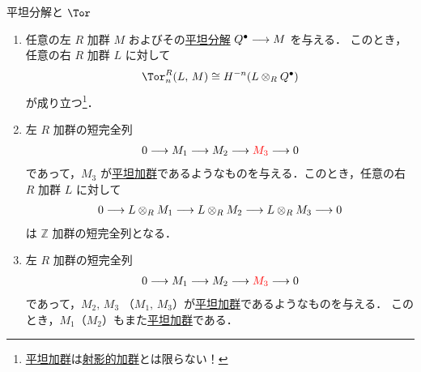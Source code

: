 \documentclass[algtopo_main]{subfiles}
\begin{document}
\begin{myprop}[label=prop:Tor-flat-2,breakable]{平坦分解と $\Tor$}
    \begin{enumerate}
        \item 任意の左 $R$ 加群 $M$ およびその\hyperref[def:flat-resolution]{平坦分解} $Q^\bullet \longrightarrow M$ を与える．
        このとき，任意の右 $R$ 加群 $L$ に対して
        \begin{align}
            \Tor^R_n(L,\, M) \cong H^{-n} (L \otimes_R Q^\bullet)
        \end{align}
        が成り立つ\footnote{\hyperref[def:flat-mod]{平坦加群}は\hyperref[def:proj-mod]{射影的加群}とは限らない！}．
        \item 左 $R$ 加群の短完全列
        \begin{align}
            0 \longrightarrow M_1 \longrightarrow M_2 \longrightarrow \textcolor{red}{M_3} \longrightarrow 0
        \end{align}
        であって，$M_3$ が\hyperref[def:flat-mod]{平坦加群}であるようなものを与える．このとき，任意の右 $R$ 加群 $L$ に対して
        \begin{align}
            0 \longrightarrow L \otimes_R M_1 \longrightarrow L \otimes_R M_2 \longrightarrow L \otimes_R M_3 \longrightarrow 0
        \end{align}
        は $\mathbb{Z}$ 加群の短完全列となる．
        \item 左 $R$ 加群の短完全列
        \begin{align}
            0 \longrightarrow M_1 \longrightarrow M_2 \longrightarrow \textcolor{red}{M_3} \longrightarrow 0
        \end{align}
        であって，$M_2,\, M_3$ （$M_1,\, M_3$）が\hyperref[def:flat-mod]{平坦加群}であるようなものを与える．
        このとき，$M_1$（$M_2$）もまた\hyperref[def:flat-mod]{平坦加群}である．
    \end{enumerate}
    
\end{myprop}
\end{document}
